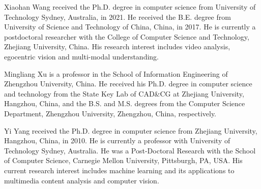 \documentclass[journal]{IEEEtran}
\begin{document}
\begin{IEEEbiography}{Xiaohan Wang}
received the Ph.D. degree in computer science from University of Technology Sydney, Australia, in 2021. He received the B.E. degree from University of Science and Technology of China, China, in 2017. He is currently a postdoctoral researcher with the College of Computer Science and Technology, Zhejiang University, China. His research interest includes video analysis, egocentric vision and multi-modal understanding.
\end{IEEEbiography}

\begin{IEEEbiography}{Mingliang Xu}  is a professor in the School of Information Engineering of Zhengzhou University, China. He received his Ph.D. degree in computer science and technology from the State Key Lab of CAD\&CG at Zhejiang University, Hangzhou, China, and the B.S. and M.S. degrees from the Computer Science Department, Zhengzhou University, Zhengzhou, China, respectively. 
\end{IEEEbiography}

\begin{IEEEbiography}{Yi Yang} received the Ph.D. degree in computer
science from Zhejiang University, Hangzhou, China, in 2010. He is currently a professor with University of Technology Sydney, Australia.
He was a Post-Doctoral Research with the School of Computer Science, Carnegie Mellon University, Pittsburgh, PA, USA. His current research interest includes machine learning and its applications to multimedia content analysis and computer vision. \end{IEEEbiography}
\end{document}
